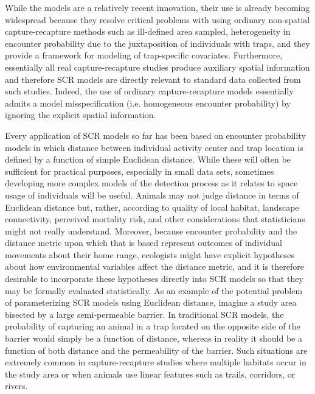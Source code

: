 \documentclass[12pt]{article}
\begin{document}
While the models are a relatively recent innovation, their use is
already becoming widespread \citep{efford_etal:2009,
  gardner_etal:2010, kery_etal:2010, efford:2011UO,
  gopalaswamy_etal:2012, foster_harmsen:2012} because they resolve critical problems with using
ordinary non-spatial capture-recapture methods such as ill-defined
area sampled, heterogeneity in encounter probability due to the
juxtaposition of individuals with traps, and they provide a framework
for modeling of trap-specific covariates.  Furthermore, essentially
all real capture-recapture studies produce auxiliary spatial
information and therefore SCR models are directly relevant to standard
data collected from such studies. Indeed, the use of ordinary
capture-recapture models essentially admits a model misspecification
(i.e. homogeneous encounter probability) by ignoring the explicit
spatial information.

Every application of SCR models so far has been based on encounter
probability models in which distance between individual activity
center and trap location is defined by a function of simple Euclidean
distance.  While these will often be sufficient for practical
purposes, especially in small data sets, sometimes developing more
complex models of the detection process as it relates to space usage
of individuals will be useful.  Animals may not judge distance in
terms of Euclidean distance but, rather, according to quality of local
habitat, landscape connectivity, perceived mortality risk, and other
considerations that statisticians might not really
understand. Moreover, because encounter probability and the distance
metric upon which that is based represent outcomes of individual
movements about their home range, ecologists might have explicit
hypotheses about how environmental variables affect the distance
metric, and it is therefore desirable to incorporate these hypotheses
directly into SCR models so that they may be formally evaluated
statistically.
As an example of the potential problem of parameterizing SCR models
using Euclidean distance, imagine a study area bisected by a large
semi-permeable barrier. In traditional SCR models, the probability of
capturing an animal in a trap located on the opposite side of the
barrier would simply be a function of distance, whereas in reality it
should be a function of both distance and the permeability of the
barrier. Such situations are extremely common in capture-recapture
studies where multiple habitats occur in the study area or when
animals use linear features such as trails, corridors, or rivers.
\end{document}
